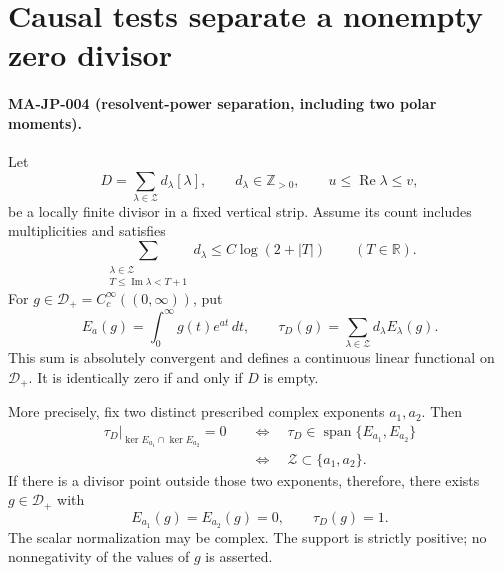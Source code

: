 \section{Causal tests separate a nonempty zero divisor}
\label{sec:causal-trace-separation}

\paragraph{MA-JP-004 (resolvent-power separation, including two polar moments).}
Let
\[
 D=\sum_{\lambda\in\mathcal Z}d_\lambda[\lambda],
 \qquad d_\lambda\in\mathbb Z_{>0},\qquad
 u\le\operatorname{Re}\lambda\le v,
 \tag{MA-JP.40}
\]
be a locally finite divisor in a fixed vertical strip.
Assume its count includes multiplicities and satisfies
\[
 \sum_{\substack{\lambda\in\mathcal Z\\
                   T\le\operatorname{Im}\lambda<T+1}}
     d_\lambda\le C\log(2+|T|)\qquad(T\in\mathbb R).
 \tag{MA-JP.41}
\]
For $g\in\mathcal D_+=C_c^\infty((0,\infty))$, put
\[
 E_a(g)=\int_0^\infty g(t)e^{at}\,dt,\qquad
 \tau_D(g)=\sum_{\lambda\in\mathcal Z}d_\lambda E_\lambda(g).
 \tag{MA-JP.42}
\]
This sum is absolutely convergent and defines a continuous
linear functional on $\mathcal D_+$.
It is identically zero if and only if $D$ is empty.

More precisely, fix two distinct prescribed complex
exponents $a_1,a_2$.  Then
\[
 \begin{split}
 \tau_D|_{\ker E_{a_1}\cap\ker E_{a_2}}=0
 &\quad\Longleftrightarrow\quad
 \tau_D\in\operatorname{span}\{E_{a_1},E_{a_2}\}\\
 &\quad\Longleftrightarrow\quad
 \mathcal Z\subset\{a_1,a_2\}.
 \end{split}
 \tag{MA-JP.43}
\]
If there is a divisor point outside those two exponents,
therefore, there exists $g\in\mathcal D_+$ with
\[
       E_{a_1}(g)=E_{a_2}(g)=0,
                         \qquad \tau_D(g)=1.
 \tag{MA-JP.44}
\]
The scalar normalization may be complex.
The support is strictly positive; no nonnegativity of
the values of $g$ is asserted.

